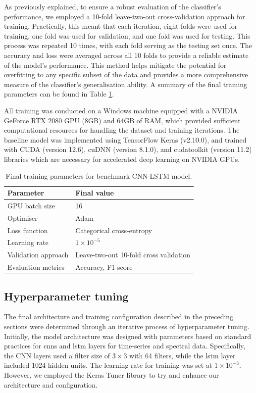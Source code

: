 As previously explained, to ensure a robust evaluation of the classifier's performance, we employed a 10-fold leave-two-out cross-validation approach for training. Practically, this meant that each iteration, eight folds were used for training, one fold was used for validation, and one fold was used for testing. This process was repeated 10 times, with each fold serving as the testing set once. The accuracy and loss were averaged across all 10 folds to provide a reliable estimate of the model's performance. This method helps mitigate the potential for overfitting to any specific subset of the data and provides a more comprehensive measure of the classifier's generalisation ability. A summary of the final training parameters can be found in Table \ref{tab:cnn-lstm-final-params}. 

All training was conducted on a Windows machine equipped with a NVIDIA GeForce RTX 2080 GPU (8GB) and 64GB of RAM, which provided sufficient computational resources for handling the dataset and training iterations. The baseline model was implemented using TensorFlow Keras (v2.10.0), and trained with CUDA (version 12.6), cuDNN (version 8.1.0), and cudatoolkit (version 11.2) libraries which are necessary for accelerated deep learning on NVIDIA GPUs. 

\begin{table}[htb]
\centering
\begin{tabular}{ll}
\toprule
\textbf{Parameter} & \textbf{Final value} \\ \midrule
GPU batch size & 16 \\
Optimiser & Adam \\
Loss function & Categorical cross-entropy \\
Learning rate & $1 \times 10^{-5}$ \\
Validation approach & Leave-two-out 10-fold cross validation \\
Evaluation metrics & Accuracy, F1-score \\ \bottomrule
\end{tabular}
\caption{Final training parameters for benchmark CNN-LSTM model.}
\label{tab:cnn-lstm-final-params}
\end{table}

\subsection{Hyperparameter tuning}

The final architecture and training configuration described in the preceding sections were determined through an iterative process of hyperparameter tuning. Initially, the model architecture was designed with parameters based on standard practices for \acrshort{cnn}s and \acrshort{lstm} layers for time-series and spectral data. Specifically, the CNN layers used a filter size of $3 \times 3$ with 64 filters, while the \acrshort{lstm} layer included 1024 hidden units. The learning rate for training was set at $1 \times 10^{-3}$. However, we employed the Keras Tuner library to try and enhance our architecture and configuration. 

